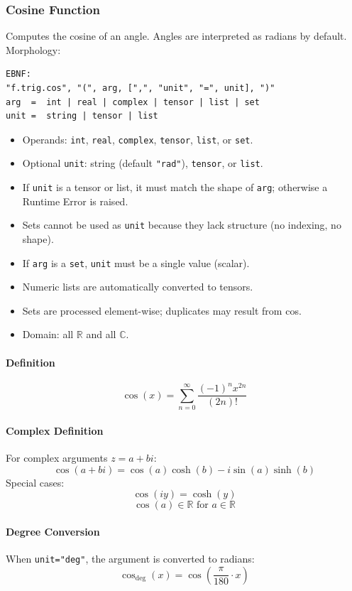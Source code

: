 \subsubsection{Cosine Function}
Computes the cosine of an angle. Angles are interpreted as radians by default.\\
Morphology:
\begin{verbatim}
EBNF:
"f.trig.cos", "(", arg, [",", "unit", "=", unit], ")"
arg  =  int | real | complex | tensor | list | set
unit =  string | tensor | list
\end{verbatim}
\begin{itemize}
\item Operands: \texttt{int}, \texttt{real}, \texttt{complex}, \texttt{tensor}, \texttt{list}, or \texttt{set}.
\item Optional \texttt{unit}: string (default \texttt{"rad"}), \texttt{tensor}, or \texttt{list}.
\item If \texttt{unit} is a tensor or list, it must match the shape of \texttt{arg}; otherwise a Runtime Error is raised.
\item Sets cannot be used as \texttt{unit} because they lack structure (no indexing, no shape).
\item If \texttt{arg} is a \texttt{set}, \texttt{unit} must be a single value (scalar).
\item Numeric lists are automatically converted to tensors.
\item Sets are processed element-wise; duplicates may result from cos.
\item Domain: all $\mathbb{R}$ and all $\mathbb{C}$.
\end{itemize}

\paragraph{Definition}
\[
\cos(x) = \sum_{n=0}^{\infty} \frac{(-1)^n x^{2n}}{(2n)!}
\]

\paragraph{Complex Definition}
For complex arguments $z = a + bi$:
\[
\cos(a + bi) = \cos(a)\cosh(b) - i\sin(a)\sinh(b)
\]
Special cases:
\[
\cos(iy) = \cosh(y)
\]
\[
\cos(a) \in \mathbb{R} \text{ for } a \in \mathbb{R}
\]

\paragraph{Degree Conversion}
When \texttt{unit="deg"}, the argument is converted to radians:
\[
\cos_{\text{deg}}(x) = \cos\left(\frac{\pi}{180} \cdot x\right)
\]

